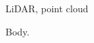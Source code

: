 \documentclass{article}
\begin{document}
\begin{kw} LiDAR, point cloud \end{kw}
\box\keybox
Body.
\end{document}
